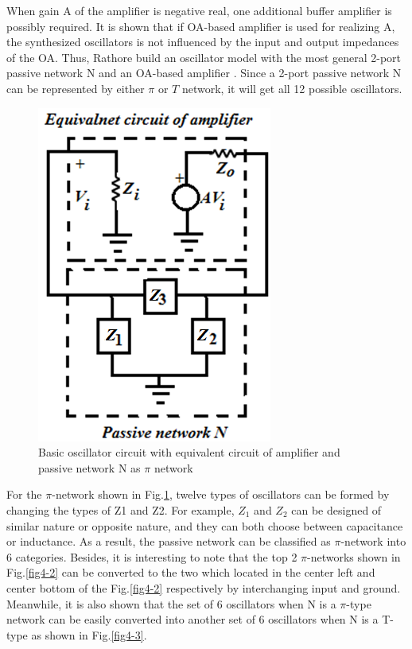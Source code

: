 \documentclass[conference]{IEEEtran}
\begin{document}
When gain A of the amplifier is negative real, one additional buffer amplifier is possibly required. It is shown that if OA-based amplifier is used for realizing A, the synthesized oscillators is not influenced by the input and output impedances of the OA. Thus, Rathore build an oscillator model with the most general 2-port passive network N and an OA-based amplifier \cite{b7}. Since a 2-port passive network N can be represented by either $\pi$ or $T$ network, it will get all 12 possible oscillators. 

\begin{figure}[!h]
\centerline{\includegraphics[scale=0.5]{fig/pic4-1.png}}
\caption{Basic oscillator circuit with equivalent circuit
of amplifier and passive network N as $\pi$ network \cite{b7}}
\label{fig4-1}
\end{figure}

For the $\pi$-network shown in Fig.\ref{fig4-1}, twelve types of oscillators can be formed by changing the types of Z1 and Z2. For example, $Z_1$ and $Z_2$ can be designed of similar nature or opposite nature, and they can both choose between capacitance or inductance. As a result, the passive network can be classified as $\pi$-network into 6 categories. Besides, it is interesting to note that the top 2 $\pi$-networks shown in Fig.\ref{fig4-2} can be converted to the two which located in the center left and center bottom of the Fig.\ref{fig4-2} respectively by interchanging input and ground. Meanwhile, it is also shown that the set of 6 oscillators when N is a $\pi$-type network can be easily converted into another set of 6 oscillators when N is a T-type as shown in Fig.\ref{fig4-3}. 
\end{document}
